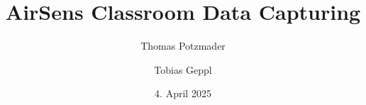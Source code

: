 \documentclass[paper=a4, 12pt]{scrreprt}
\title{AirSens Classroom Data Capturing}
\author{Thomas Potzmader \and Tobias Geppl}
\date{4. April 2025}
\begin{document}
\frontmatter

\maketitle

\newpage\null\thispagestyle{empty}%

\begin{affidavit}
\end{affidavit}


\cleardoublepage                                              %




                             


\renewcommand*\chapterpagestyle{scrheadings}
\tableofcontents

\end{document}
